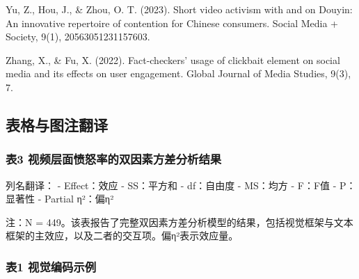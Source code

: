 \documentclass[
]{article}
\begin{document}
Yu, Z., Hou, J., \& Zhou, O. T. (2023). Short video activism with and on
Douyin: An innovative repertoire of contention for Chinese consumers.
Social Media + Society, 9(1), 20563051231157603.

Zhang, X., \& Fu, X. (2022). Fact-checkers' usage of clickbait element
on social media and its effects on user engagement. Global Journal of
Media Studies, 9(3), 7.

\subsection{表格与图注翻译}\label{ux8868ux683cux4e0eux56feux6ce8ux7ffbux8bd1}

\subsubsection{表3
视频层面愤怒率的双因素方差分析结果}\label{ux88683-ux89c6ux9891ux5c42ux9762ux6124ux6012ux7387ux7684ux53ccux56e0ux7d20ux65b9ux5deeux5206ux6790ux7ed3ux679c}

列名翻译： - Effect：效应 - SS：平方和 - df：自由度 - MS：均方 - F：F值
- P：显著性 - Partial η²：偏η²

注：N =
449。该表报告了完整双因素方差分析模型的结果，包括视觉框架与文本框架的主效应，以及二者的交互项。偏η²表示效应量。

\subsubsection{表1
视觉编码示例}\label{ux88681-ux89c6ux89c9ux7f16ux7801ux793aux4f8b}
\end{document}
